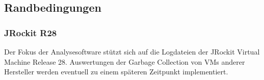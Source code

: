\subsection{Randbedingungen}\label{randbedingungen}
\subsubsection{JRockit R28}
Der Fokus der Analysesoftware stützt sich auf die Logdateien der JRockit Virtual Machine Release 28. Auswertungen der Garbage Collection von VMs anderer Hersteller werden eventuell zu einem späteren Zeitpunkt implementiert. 




